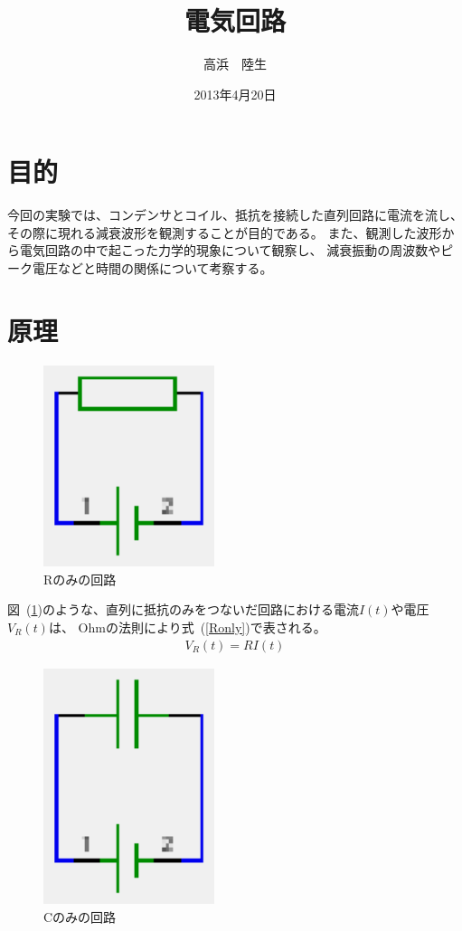 \documentclass[a4j,10pt]{jarticle}
\title{電気回路}
\author{高浜　陸生}
\date{2013年4月20日}
\newcommand{\Equref}[1]{式~(\ref{#1})}
\newcommand{\Figref}[1]{図~(\ref{#1})}
\begin{document}
\section{目的}
今回の実験では、コンデンサとコイル、抵抗を接続した直列回路に電流を流し、
その際に現れる減衰波形を観測することが目的である。
また、観測した波形から電気回路の中で起こった力学的現象について観察し、
減衰振動の周波数やピーク電圧などと時間の関係について考察する。
\section{原理}
\begin{figure}[h]
\begin{center}
\includegraphics[width=5cm]{R.eps}
\caption{Rのみの回路}
\label{R}
\end{center}
\end{figure}
\Figref{R}のような、直列に抵抗のみをつないだ回路における電流$I(t)$や電圧$V_{R}(t)$は、
Ohmの法則により\Equref{Ronly}で表される。
\begin{eqnarray}
\label{Ronly}
V_{R}(t)=RI(t)
\end{eqnarray}

\begin{figure}[h]
\begin{center}
\includegraphics[width=5cm]{C.eps}
\caption{Cのみの回路}
\label{C}
\end{center}
\end{figure}
\end{document}
